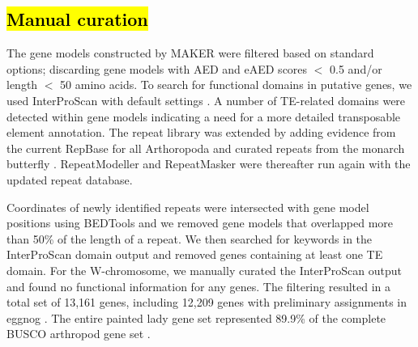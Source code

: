 \documentclass[twocolumn]{bmcart}%
\begin{document}
\subsection*{\hl{Manual curation}}  
The gene models constructed by MAKER were filtered based on standard options; discarding gene models with AED and eAED scores $<$ 0.5 and/or length $<$ 50 amino acids. To search for functional domains in putative genes, we used InterProScan with default settings \cite{jonesInterProScanGenomescaleProtein2014}. A number of TE-related domains were detected within gene models indicating a need for a more detailed transposable element annotation. The repeat library was extended by adding evidence from the current RepBase for all Arthoropoda \cite{baoRepbaseUpdateDatabase2015} and curated repeats from the monarch butterfly \cite{zhanMonarchBaseMonarchButterfly2013}. RepeatModeller \cite{} and RepeatMasker \cite{holtMAKER2AnnotationPipeline2011} were thereafter run again with the updated repeat database.

Coordinates of newly identified repeats were intersected with gene model positions using BEDTools \cite{quinlanBEDToolsFlexibleSuite2010} and we removed gene models that overlapped more than 50\% of the length of a repeat. We then searched for keywords in the InterProScan domain output and removed genes containing at least one TE domain. For the W-chromosome, we manually curated the InterProScan output and found no functional information for any genes. The filtering resulted in a total set of 13,161 genes, including 12,209 genes with preliminary assignments in eggnog \cite{huerta-cepasEggNOGHierarchicalFunctionally2019}. The entire painted lady gene set represented 89.9\% of the complete BUSCO arthropod gene set \cite{manniBUSCOUpdateNovel2021}.
\end{document}
